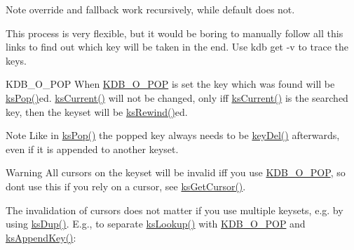 \begin{DoxyNote}{Note}
override and fallback work recursively, while default does not.
\end{DoxyNote}
This process is very flexible, but it would be boring to manually follow all this links to find out which key will be taken in the end. Use {\ttfamily kdb get -\/v} to trace the keys.

\begin{DoxyParagraph}{K\+D\+B\+\_\+\+O\+\_\+\+P\+OP}
When \mbox{\hyperlink{group__keyset_gga98a3d6a4016c9dad9cbd1a99a9c2a45aa52fb5f2cc86773d393da62bebebf7984}{K\+D\+B\+\_\+\+O\+\_\+\+P\+OP}} is set the key which was found will be \mbox{\hyperlink{group__keyset_gae42530b04defb772059de0600159cf69}{ks\+Pop()}}ed. \mbox{\hyperlink{group__keyset_ga4287b9416912c5f2ab9c195cb74fb094}{ks\+Current()}} will not be changed, only iff \mbox{\hyperlink{group__keyset_ga4287b9416912c5f2ab9c195cb74fb094}{ks\+Current()}} is the searched key, then the keyset will be \mbox{\hyperlink{group__keyset_gabe793ff51f1728e3429c84a8a9086b70}{ks\+Rewind()}}ed.
\end{DoxyParagraph}
\begin{DoxyNote}{Note}
Like in \mbox{\hyperlink{group__keyset_gae42530b04defb772059de0600159cf69}{ks\+Pop()}} the popped key always needs to be \mbox{\hyperlink{group__key_ga3df95bbc2494e3e6703ece5639be5bb1}{key\+Del()}} afterwards, even if it is appended to another keyset.
\end{DoxyNote}
\begin{DoxyWarning}{Warning}
All cursors on the keyset will be invalid iff you use \mbox{\hyperlink{group__keyset_gga98a3d6a4016c9dad9cbd1a99a9c2a45aa52fb5f2cc86773d393da62bebebf7984}{K\+D\+B\+\_\+\+O\+\_\+\+P\+OP}}, so don\textquotesingle{}t use this if you rely on a cursor, see \mbox{\hyperlink{group__keyset_gaffe507ab9281c322eb16c3e992075d29}{ks\+Get\+Cursor()}}.
\end{DoxyWarning}
The invalidation of cursors does not matter if you use multiple keysets, e.\+g. by using \mbox{\hyperlink{group__keyset_gac59e4b328245463f1451f68d5106151c}{ks\+Dup()}}. E.\+g., to separate \mbox{\hyperlink{group__keyset_gaa34fc43a081e6b01e4120daa6c112004}{ks\+Lookup()}} with \mbox{\hyperlink{group__keyset_gga98a3d6a4016c9dad9cbd1a99a9c2a45aa52fb5f2cc86773d393da62bebebf7984}{K\+D\+B\+\_\+\+O\+\_\+\+P\+OP}} and \mbox{\hyperlink{group__keyset_gaa5a1d467a4d71041edce68ea7748ce45}{ks\+Append\+Key()}}\+:


